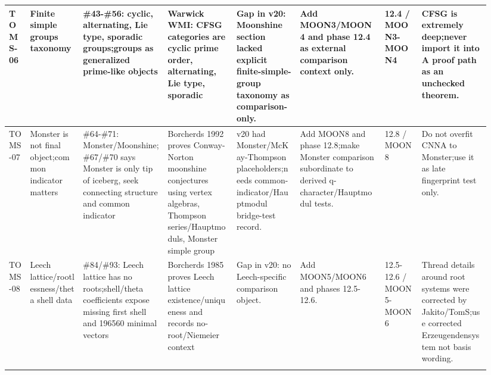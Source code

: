 \begin{longtable}{L{0.04\linewidth} L{0.105\linewidth} L{0.16\linewidth} L{0.13\linewidth} L{0.125\linewidth} L{0.165\linewidth} L{0.075\linewidth} L{0.135\linewidth}}
\hline
\addlinespace[0.24em]
TOMS-06 & Finite simple groups taxonomy & \#43-\#56: cyclic, alternating, Lie type, sporadic groups;\newline groups as generalized prime-like objects & Warwick WMI: CFSG categories are cyclic prime order, alternating, Lie type, sporadic & Gap in v20: Moonshine section lacked explicit finite-simple-group taxonomy as comparison-only. & Add MOON3/\allowbreak{}MOON4 and phase 12.4 as external comparison context only. & 12.4 /\allowbreak{} MOON3-MOON4 & CFSG is extremely deep;\newline never import it into A proof path as an unchecked theorem.\\
\hline
\addlinespace[0.24em]
TOMS-07 & Monster is not final object;\newline common indicator matters & \#64-\#71: Monster/\allowbreak{}Moonshine;\newline \#67/\allowbreak{}\#70 says Monster is only tip of iceberg, seek connecting structure and common indicator & Borcherds 1992 proves Conway-Norton moonshine conjectures using vertex algebras, Thompson series/\allowbreak{}Hauptmoduls, Monster simple group & v20 had Monster/\allowbreak{}McKay-Thompson placeholders;\newline needs common-indicator/\allowbreak{}Hauptmodul bridge-test record. & Add MOON8 and phase 12.8;\newline make Monster comparison subordinate to derived q-character/\allowbreak{}Hauptmodul tests. & 12.8 /\allowbreak{} MOON8 & Do not overfit CNNA to Monster;\newline use it as late fingerprint test only.\\
\hline
\addlinespace[0.24em]
TOMS-08 & Leech lattice/\allowbreak{}rootlessness/\allowbreak{}theta shell data & \#84/\allowbreak{}\#93: Leech lattice has no roots;\newline shell/\allowbreak{}theta coefficients expose missing first shell and 196560 minimal vectors & Borcherds 1985 proves Leech lattice existence/\allowbreak{}uniqueness and records no-root/\allowbreak{}Niemeier context & Gap in v20: no Leech-specific comparison object. & Add MOON5/\allowbreak{}MOON6 and phases 12.5-12.6. & 12.5-12.6 /\allowbreak{} MOON5-MOON6 & Thread details around root systems were corrected by Jakito/\allowbreak{}TomS;\newline use corrected Erzeugendensystem not basis wording.\\
\hline
\addlinespace[0.24em]

\end{longtable}
